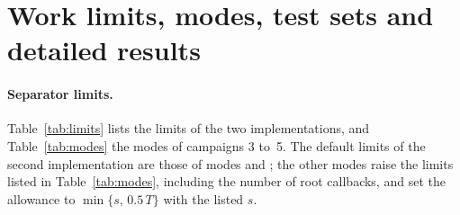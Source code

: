 \section{Work limits, modes, test sets and detailed results}\label{app:software}\label{app:instances}

\paragraph{Separator limits.}
Table~\ref{tab:limits} lists the limits of the two implementations, and
Table~\ref{tab:modes} the modes of campaigns 3 to~5. The default limits of
the second implementation are those of modes  and ; the
other modes raise the limits listed in Table~\ref{tab:modes}, including the
number of root callbacks, and set the allowance to $\min\{s,\,0.5\,T\}$ with
the listed $s$.

